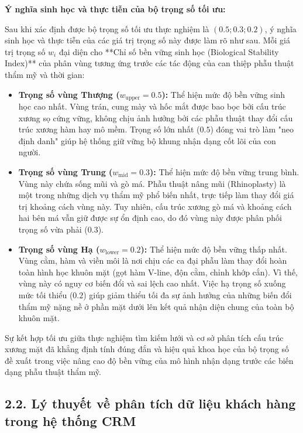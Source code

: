 \noindent \textbf{Ý nghĩa sinh học và thực tiễn của bộ trọng số tối ưu:}

Sau khi xác định được bộ trọng số tối ưu thực nghiệm là $(0.5; 0.3; 0.2)$, ý nghĩa sinh học và thực tiễn của các giá trị trọng số này được làm rõ như sau. Mỗi giá trị trọng số $w_i$ đại diện cho **Chỉ số bền vững sinh học (Biological Stability Index)** của phân vùng tương ứng trước các tác động của can thiệp phẫu thuật thẩm mỹ và thời gian:
\begin{itemize}
    \item \textbf{Trọng số vùng Thượng ($w_{\text{upper}} = 0.5$):} Thể hiện mức độ bền vững sinh học cao nhất. Vùng trán, cung mày và hốc mắt được bao bọc bởi cấu trúc xương sọ cứng vững, không chịu ảnh hưởng bởi các phẫu thuật thay đổi cấu trúc xương hàm hay mô mềm. Trọng số lớn nhất ($0.5$) đóng vai trò làm "neo định danh" giúp hệ thống giữ vững bộ khung nhận dạng cốt lõi của con người.
    
    \item \textbf{Trọng số vùng Trung ($w_{\text{mid}} = 0.3$):} Thể hiện mức độ bền vững trung bình. Vùng này chứa sống mũi và gò má. Phẫu thuật nâng mũi (Rhinoplasty) là một trong những dịch vụ thẩm mỹ phổ biến nhất, trực tiếp làm thay đổi giá trị khoảng cách vùng này. Tuy nhiên, cấu trúc xương gò má và khoảng cách hai bên má vẫn giữ được sự ổn định cao, do đó vùng này được phân phối trọng số vừa phải ($0.3$).
    
    \item \textbf{Trọng số vùng Hạ ($w_{\text{lower}} = 0.2$):} Thể hiện mức độ bền vững thấp nhất. Vùng cằm, hàm và viền môi là nơi chịu các ca đại phẫu làm thay đổi hoàn toàn hình học khuôn mặt (gọt hàm V-line, độn cằm, chỉnh khớp cắn). Vì thế, vùng này có nguy cơ biến đổi và sai lệch cao nhất. Việc hạ trọng số xuống mức tối thiểu ($0.2$) giúp giảm thiểu tối đa sự ảnh hưởng của những biến đổi thẩm mỹ nặng nề ở phần mặt dưới lên kết quả nhận diện chung của toàn bộ khuôn mặt.
\end{itemize}

Sự kết hợp tối ưu giữa thực nghiệm tìm kiếm lưới và cơ sở phân tích cấu trúc xương mặt đã khẳng định tính đúng đắn và hiệu quả khoa học của bộ trọng số đề xuất trong việc nâng cao độ bền vững của mô hình nhận dạng trước các biến dạng phẫu thuật thẩm mỹ.

\subsection*{2.2. Lý thuyết về phân tích dữ liệu khách hàng trong hệ thống CRM}



